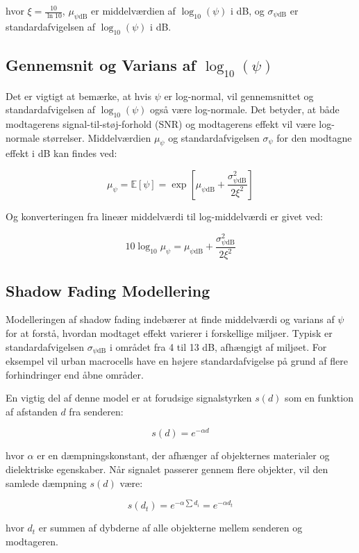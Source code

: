 \documentclass[a4paper,12pt]{book}
\begin{document}
	hvor \( \xi = \frac{10}{\ln 10} \), \( \mu_{\psi\text{dB}} \) er middelværdien af \( \log_{10}(\psi) \) i dB, og \( \sigma_{\psi\text{dB}} \) er standardafvigelsen af \( \log_{10}(\psi) \) i dB.
	
	\subsection{Gennemsnit og Varians af \( \log_{10}(\psi) \)}
	
	Det er vigtigt at bemærke, at hvis \( \psi \) er log-normal, vil gennemsnittet og standardafvigelsen af \( \log_{10}(\psi) \) også være log-normale. Det betyder, at både modtagerens signal-til-støj-forhold (SNR) og modtagerens effekt vil være log-normale størrelser. Middelværdien \( \mu_\psi \) og standardafvigelsen \( \sigma_\psi \) for den modtagne effekt i dB kan findes ved:
	
	\[
	\mu_\psi = \mathbb{E}[\psi] = \exp \left[ \mu_{\psi\text{dB}} + \frac{\sigma_{\psi\text{dB}}^2}{2\xi^2} \right]
	\]
	
	Og konverteringen fra lineær middelværdi til log-middelværdi er givet ved:
	
	\[
	10 \log_{10} \mu_\psi = \mu_{\psi\text{dB}} + \frac{\sigma_{\psi\text{dB}}^2}{2\xi^2}
	\]
	
	\subsection{Shadow Fading Modellering}
	
	Modelleringen af shadow fading indebærer at finde middelværdi og varians af \( \psi \) for at forstå, hvordan modtaget effekt varierer i forskellige miljøer. Typisk er standardafvigelsen \( \sigma_{\psi\text{dB}} \) i området fra 4 til 13 dB, afhængigt af miljøet. For eksempel vil urban macrocells have en højere standardafvigelse på grund af flere forhindringer end åbne områder.
	
	En vigtig del af denne model er at forudsige signalstyrken \( s(d) \) som en funktion af afstanden \( d \) fra senderen:
	
	\[
	s(d) = e^{-\alpha d}
	\]
	
	hvor \( \alpha \) er en dæmpningskonstant, der afhænger af objekternes materialer og dielektriske egenskaber. Når signalet passerer gennem flere objekter, vil den samlede dæmpning \( s(d) \) være:
	
	\[
	s(d_t) = e^{-\alpha \sum d_i} = e^{-\alpha d_t}
	\]
	
	hvor \( d_t \) er summen af dybderne af alle objekterne mellem senderen og modtageren.
	
\end{document}
